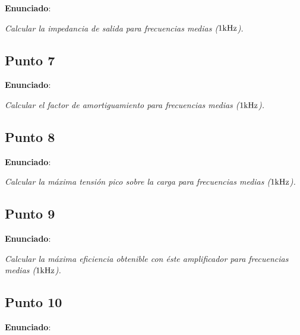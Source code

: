 \textbf{Enunciado}: 

\textsl{Calcular la impedancia de salida para frecuencias medias ($1 \si[per-mode=symbol]{\kilo\hertz}$).}



\subsection{Punto 7}

\textbf{Enunciado}: 

\textsl{Calcular el factor de amortiguamiento para frecuencias medias ($1 \si[per-mode=symbol]{\kilo\hertz}$).}



\subsection{Punto 8}

\textbf{Enunciado}: 

\textsl{Calcular la máxima tensión pico sobre la carga para frecuencias medias ($1 \si[per-mode=symbol]{\kilo\hertz}$).}



\subsection{Punto 9}

\textbf{Enunciado}: 

\textsl{Calcular la máxima eficiencia obtenible con éste amplificador para frecuencias medias ($1 \si[per-mode=symbol]{\kilo\hertz}$).}



\subsection{Punto 10}
\label{thermal}

\textbf{Enunciado}: 



